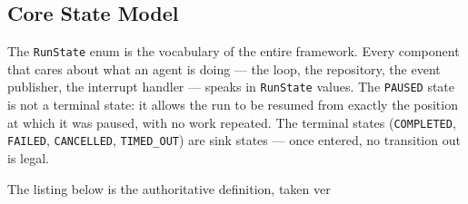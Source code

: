 \subsection{Core State Model}
\label{subsec:core-state-model}

The \texttt{RunState} enum is the vocabulary of the entire framework.
Every component that cares about what an agent is doing — the loop, the repository,
the event publisher, the interrupt handler — speaks in \texttt{RunState} values.
The \texttt{PAUSED} state is not a terminal state: it allows the run to be
resumed from exactly the position at which it was paused, with no work repeated.
The terminal states (\texttt{COMPLETED}, \texttt{FAILED}, \texttt{CANCELLED},
\texttt{TIMED\_OUT}) are sink states — once entered, no transition out is legal.

The listing below is the authoritative definition, taken ver